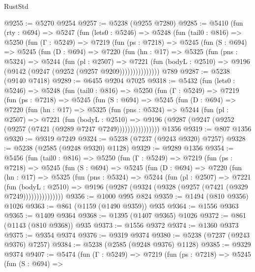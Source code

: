 \begin{lexlean}{RustStd}
\begin{coremodule}
@9255 := @5270 @9254
@9257 := @5238 (@9255 @7280)
@9285 := @5410
    (fun (rty : @694) =>
    @5247
      (fun (lets0 : @5246) =>
      @5248
        (fun (tail0 : @816) =>
        @5250
          (fun (Γ : @5249) =>
          @7219
            (fun (ps : @7218) =>
            @5245
              (fun (S : @694) =>
              @5245
                (fun (D : @694) =>
                @7220
                  (fun (hn : @17) =>
                  @5325
                    (fun (pns : @5324) =>
                    @5244
                      (fun (pl : @2507) =>
                      @7221
                        (fun (bodyL : @2510) =>
                        @9196 (@9142 (@9247 (@9252 (@9257 @9209)))))))))))))))
    @789
@9287 := @5238 (@9140 @7418)
@9289 := @6455 @9204 @7025
@9318 := @5432
    (fun (lets0 : @5246) =>
    @5248
      (fun (tail0 : @816) =>
      @5250
        (fun (Γ : @5249) =>
        @7219
          (fun (ps : @7218) =>
          @5245
            (fun (S : @694) =>
            @5245
              (fun (D : @694) =>
              @7220
                (fun (hn : @17) =>
                @5325
                  (fun (pns : @5324) =>
                  @5244
                    (fun (pl : @2507) =>
                    @7221
                      (fun (bodyL : @2510) =>
                      @9196 (@9287 (@9247 (@9252 (@9257 (@7421 (@9289 @7247 @7249))))))))))))))))
    @1356
@9319 := @807 @1356
@9320 := @9319 @7249
@9324 := @5238 (@7237 (@9243 @9320) @7257)
@9328 := @5238 (@2585 (@9248 @9320) @1128)
@9329 := @9289 @1356
@9354 := @5456
    (fun (tail0 : @816) =>
    @5250
      (fun (Γ : @5249) =>
      @7219
        (fun (ps : @7218) =>
        @5245
          (fun (S : @694) =>
          @5245
            (fun (D : @694) =>
            @7220
              (fun (hn : @17) =>
              @5325
                (fun (pns : @5324) =>
                @5244
                  (fun (pl : @2507) =>
                  @7221
                    (fun (bodyL : @2510) =>
                    @9196 (@9287 (@9324 (@9328 (@9257 (@7421 (@9329 @7249)))))))))))))))
@9356 := @1000 @995 @824
@9359 := @1494 (@810 @9356) @1026
@9363 := @861 (@1159 (@1490 @9359)) @935
@9364 := @1556 @9363
@9365 := @1409 @9364
@9368 := @1395 (@1407 @9365) @1026
@9372 := @861 (@1143 (@810 @9368)) @935
@9373 := @1556 @9372
@9374 := @1360 @9373
@9375 := @9354 @9374
@9376 := @9319 @9374
@9380 := @5238 (@7237 (@9243 @9376) @7257)
@9384 := @5238 (@2585 (@9248 @9376) @1128)
@9385 := @9329 @9374
@9407 := @5474
    (fun (Γ : @5249) =>
    @7219
      (fun (ps : @7218) =>
      @5245
        (fun (S : @694) =>

\end{coremodule}
\end{lexlean}

